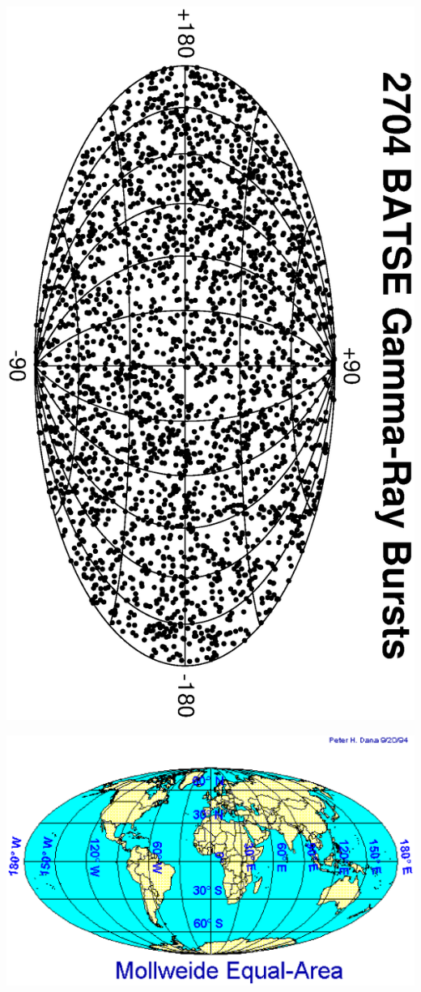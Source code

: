 \documentclass[12pt]{article}
\begin{document}
\begin{minipage}{\linewidth}
  \hspace{0 cm} \includegraphics[width=0.8\linewidth]{batse.eps}
\end{minipage}

\pagebreak

\begin{minipage}{\linewidth}
  \vspace{-2 cm}
  \includegraphics[width=1.5\linewidth, angle=-90]{mollweide_equal_area.eps}
\end{minipage}
\end{document}
